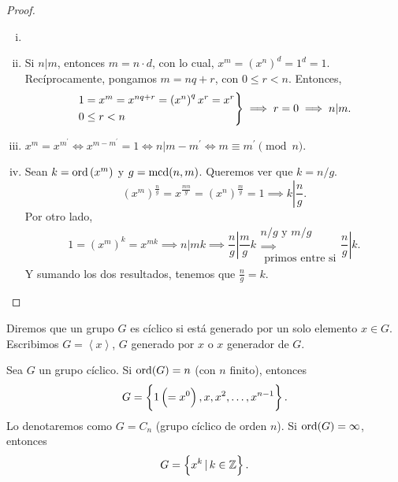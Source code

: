 \begin{proof}
    \begin{enumerate}[i)]
        \item[]
        \item Si $n \vert m$, entonces $m = n \cdot d$, con lo cual, $x^m = \left( x^n \right)^d = 1^d = 1$. Recíprocamente, pongamos $m = nq + r$, con $0 \leq r < n$. Entonces,
            \[
                \begin{rcases}
                    1 = x^m = x^{nq + r} = \left( x^n \right)^q x^r = x^r \\
                    0 \leq r < n
                \end{rcases}
                \implies r = 0 \implies n \vert m.
            \]
        \item $x^m = x^{m^\prime} \iff x^{m - m^\prime} = 1 \iff n \vert m - m^\prime \iff
            m \equiv m^\prime \pmod{n}$.
        \item Sean $k = \operatorname{ord}\left( x^m \right)$ y $g = \operatorname{mcd}(n, m)$. Queremos ver que $k = n/g$.
            \[
                \left( x^m \right)^{\frac{n}{g}} = x^{\frac{mn}{g}} = \left( x^n \right)^{\frac{m}{g}} = 1
                \implies k \left\vert \frac{n}{g} \right. .
            \]
            Por otro lado,
            \[
                1 = \left( x^m \right)^k = x^{mk} \implies n \vert mk \implies \left.\frac{n}{g} \right\vert \frac{m}{g} k
                \substack{n/g \text{ y } m/g \\ \implies \\ \text{ primos entre si}} \left.\frac{n}{g} \right\vert k.
            \]
            Y sumando los dos resultados, tenemos que $\frac{n}{g} = k$.
    \end{enumerate}
\end{proof}

\begin{defi}
    Diremos que un grupo $G$ es cíclico si está generado por un solo elemento $x \in G$. Escribimos $G = \left< x \right>$, $G$
    generado por $x$ o $x$ generador de $G$.
\end{defi}

\begin{obs}
    Sea $G$ un grupo cíclico. Si $\operatorname{ord}(G) = n$ (con $n$ finito), entonces
    \[
        G = \left\{ 1 \left( = x^0 \right), x, x^2, \dots, x^{n-1}\right\}.
    \]
    Lo denotaremos como $G = C_n$ (grupo cíclico de orden $n$).
    Si $\operatorname{ord}(G) = \infty$, entonces
    \[
        G = \left\{x^k \,\vert\, k \in \mathbb{Z}\right\}.
    \]
\end{obs}


